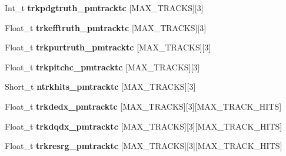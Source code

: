 \begin{DoxyCompactItemize}
\item 
\hypertarget{classanatree_a48631f8f358d5da86116bb593b7882e5}{Int\-\_\-t {\bfseries trkpdgtruth\-\_\-pmtracktc} \mbox{[}M\-A\-X\-\_\-\-T\-R\-A\-C\-K\-S\mbox{]}\mbox{[}3\mbox{]}}\label{classanatree_a48631f8f358d5da86116bb593b7882e5}

\item 
\hypertarget{classanatree_a04e336aa3d32304ac0036dfab7dbd11e}{Float\-\_\-t {\bfseries trkefftruth\-\_\-pmtracktc} \mbox{[}M\-A\-X\-\_\-\-T\-R\-A\-C\-K\-S\mbox{]}\mbox{[}3\mbox{]}}\label{classanatree_a04e336aa3d32304ac0036dfab7dbd11e}

\item 
\hypertarget{classanatree_a489a3d21d6372888890032f2e566fed4}{Float\-\_\-t {\bfseries trkpurtruth\-\_\-pmtracktc} \mbox{[}M\-A\-X\-\_\-\-T\-R\-A\-C\-K\-S\mbox{]}\mbox{[}3\mbox{]}}\label{classanatree_a489a3d21d6372888890032f2e566fed4}

\item 
\hypertarget{classanatree_a883bde0d3ffe160c1ca7811804956109}{Float\-\_\-t {\bfseries trkpitchc\-\_\-pmtracktc} \mbox{[}M\-A\-X\-\_\-\-T\-R\-A\-C\-K\-S\mbox{]}\mbox{[}3\mbox{]}}\label{classanatree_a883bde0d3ffe160c1ca7811804956109}

\item 
\hypertarget{classanatree_a2c1291bed14180d4df5d6292b7b1e9b7}{Short\-\_\-t {\bfseries ntrkhits\-\_\-pmtracktc} \mbox{[}M\-A\-X\-\_\-\-T\-R\-A\-C\-K\-S\mbox{]}\mbox{[}3\mbox{]}}\label{classanatree_a2c1291bed14180d4df5d6292b7b1e9b7}

\item 
\hypertarget{classanatree_a18ee2ecb81bb2a92724ff7e2b16d3044}{Float\-\_\-t {\bfseries trkdedx\-\_\-pmtracktc} \mbox{[}M\-A\-X\-\_\-\-T\-R\-A\-C\-K\-S\mbox{]}\mbox{[}3\mbox{]}\mbox{[}M\-A\-X\-\_\-\-T\-R\-A\-C\-K\-\_\-\-H\-I\-T\-S\mbox{]}}\label{classanatree_a18ee2ecb81bb2a92724ff7e2b16d3044}

\item 
\hypertarget{classanatree_aa4e8ceac389407e64b9a5301f3762604}{Float\-\_\-t {\bfseries trkdqdx\-\_\-pmtracktc} \mbox{[}M\-A\-X\-\_\-\-T\-R\-A\-C\-K\-S\mbox{]}\mbox{[}3\mbox{]}\mbox{[}M\-A\-X\-\_\-\-T\-R\-A\-C\-K\-\_\-\-H\-I\-T\-S\mbox{]}}\label{classanatree_aa4e8ceac389407e64b9a5301f3762604}

\item 
\hypertarget{classanatree_a0f4da8ade2fa111900058c274e9d099a}{Float\-\_\-t {\bfseries trkresrg\-\_\-pmtracktc} \mbox{[}M\-A\-X\-\_\-\-T\-R\-A\-C\-K\-S\mbox{]}\mbox{[}3\mbox{]}\mbox{[}M\-A\-X\-\_\-\-T\-R\-A\-C\-K\-\_\-\-H\-I\-T\-S\mbox{]}}\label{classanatree_a0f4da8ade2fa111900058c274e9d099a}


\end{DoxyCompactItemize}
